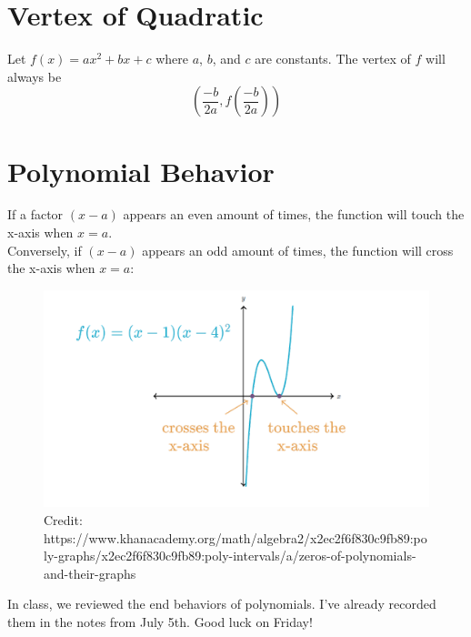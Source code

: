 \documentclass[12pt]{article}
\begin{document}
\section{Vertex of Quadratic}

Let \(f(x)=ax^2+bx+c\) where \(a\), \(b\), and \(c\) are constants. The vertex of \(f\) will always be\\

\[\left(\frac{-b}{2a}, f\left(\frac{-b}{2a}\right)\right)\]

\section{Polynomial Behavior}

If a factor \((x-a)\) appears an even amount of times, the function will touch the x-axis when \(x=a\).\\

Conversely, if \((x-a)\) appears an odd amount of times, the function will cross the x-axis when \(x=a\):

\begin{figure}[H]
	\centering
	\includegraphics[scale=1]{Polynomial touching.png}
	\caption{Credit: https://www.khanacademy.org/math/algebra2/x2ec2f6f830c9fb89:poly-graphs/x2ec2f6f830c9fb89:poly-intervals/a/zeros-of-polynomials-and-their-graphs}
\end{figure}

In class, we reviewed the end behaviors of polynomials. I've already recorded them in the notes from July 5th. Good luck on Friday!
\end{document}
